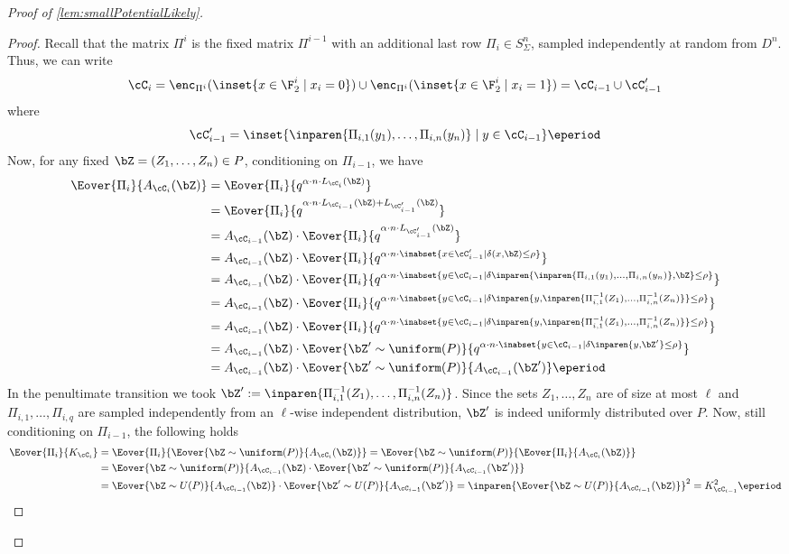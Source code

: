 \documentclass[11pt]{article}
\begin{document}
\begin{proof}[Proof of \cref{lem:smallPotentialLikely}]
    \begin{proof}
    Recall that the matrix $\Pi^i$ is the fixed matrix $\Pi^{i-1}$ with an additional last row $\Pi_i \in S_\Sigma^n$, sampled independently at random from $D^n$. Thus, we can write 
    $$\cC_i = \enc_{\Pi^i}(\inset{x\in \F_2^i \mid x_i = 0}) \cup \enc_{\Pi^i}(\inset{x\in \F_2^i \mid x_i = 1}) = \cC_{i-1} \cup \cC'_{i-1}$$
    where
    $$\cC'_{i-1} = \inset{\inparen{\Pi_{i,1}(y_1),\dots,\Pi_{i,n}(y_n)} \mid y\in \cC_{i-1}}\eperiod$$
    Now, for any fixed $\bZ = (Z_1,\dots, Z_n) \in P$, conditioning on $\Pi_{i-1}$, we have
    \begin{align*}
        \Eover{\Pi_i}{A_{\cC_i}(\bZ)} &= \Eover{\Pi_i}{q^{\alpha\cdot n\cdot L_{\cC_i}(\bZ)}} \\ &= \Eover{\Pi_i}{q^{\alpha\cdot n\cdot L_{\cC_{i-1}}(\bZ)+L_{\cC'_{i-1}}(\bZ)}} \\ 
        &= A_{\cC_{i-1}}(\bZ)\cdot\Eover{\Pi_i}{ q^{\alpha\cdot n\cdot L_{\cC'_{i-1}}(\bZ)} } \\ 
        &= A_{\cC_{i-1}}(\bZ)\cdot\Eover{\Pi_i}{q^{\alpha\cdot n\cdot \inabset{x\in \cC'_{i-1} \mid \delta(x,\bZ)\le \rho}} } \\
        &= A_{\cC_{i-1}}(\bZ)\cdot\Eover{\Pi_i}{q^{\alpha\cdot n\cdot \inabset{y\in \cC_{i-1} \mid \delta\inparen{\inparen{\Pi_{i,1}(y_1),\dots,\Pi_{i,n}(y_n)},\bZ}\le \rho}} } \\
        &= A_{\cC_{i-1}}(\bZ)\cdot\Eover{\Pi_i}{q^{\alpha\cdot n\cdot \inabset{y\in \cC_{i-1} \mid \delta\inparen{y,\inparen{\Pi_{i,1}^{-1}(Z_1),\dots,\Pi_{i,n}^{-1}(Z_n)}}\le \rho}} } \\
        &= A_{\cC_{i-1}}(\bZ)\cdot\Eover{\Pi_i}{q^{\alpha\cdot n\cdot \inabset{y\in \cC_{i-1} \mid \delta\inparen{y,\inparen{\Pi_{i,1}^{-1}(Z_1),\dots,\Pi_{i,n}^{-1}(Z_n)}}\le \rho}} } \\
        &= A_{\cC_{i-1}}(\bZ)\cdot\Eover{\bZ' \sim \uniform(P)}{q^{\alpha\cdot n\cdot \inabset{y\in \cC_{i-1} \mid \delta\inparen{y,\bZ'}\le \rho}} } \\
        &= A_{\cC_{i-1}}(\bZ)\cdot\Eover{\bZ' \sim \uniform(P)}{A_{\cC_{i-1}}(\bZ') }\eperiod
    \end{align*}
    In the penultimate transition we took $\bZ' := \inparen{\Pi^{-1}_{i,1}(Z_1),\dots, \Pi^{-1}_{i,n}(Z_n)}$. Since the sets $Z_1,\dots, Z_n$ are of size at most $\ell$ and  $\Pi_{i,1},\dots, \Pi_{i,q}$ are sampled independently from an $\ell$-wise independent distribution, $\bZ'$ is indeed uniformly distributed over $P$. Now, still conditioning on $\Pi_{i-1}$, the following holds
    \begin{align*}
    \Eover{\Pi_i}{K_{\cC_i}} &= \Eover{\Pi_i}{\Eover{\bZ\sim \uniform(P)}{{A_{\cC_i}(\bZ)}}} =  \Eover{\bZ\sim \uniform(P)}{\Eover{\Pi_i}{{A_{\cC_i}(\bZ)}}}\\
    &=
    \Eover{\bZ\sim \uniform(P)}{A_{\cC_{i-1}}(\bZ)\cdot\Eover{\bZ'\sim \uniform(P)}{A_{\cC_{i-1}}(\bZ')}} \\
    &= \Eover{\bZ\sim U(P)}{A_{\cC_{i-1}}(\bZ)} \cdot \Eover{\bZ'\sim U(P)}{A_{\cC_{i-1}}(\bZ')} = \inparen{\Eover{\bZ\sim U(P)}{A_{\cC_{i-1}}(\bZ)}}^2 = K_{\cC_{i-1}}^2\eperiod
    \end{align*}


\end{proof}
\end{proof}
\end{document}
